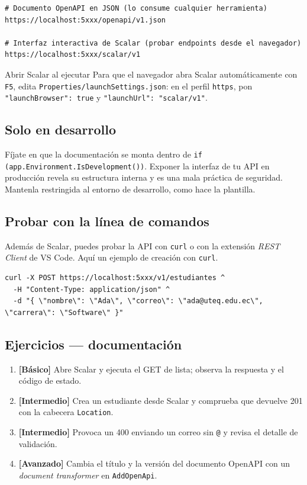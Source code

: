\documentclass[11pt]{article}
\begin{document}
\begin{cajacodigo}
\begin{lstlisting}[style=shell]
# Documento OpenAPI en JSON (lo consume cualquier herramienta)
https://localhost:5xxx/openapi/v1.json

# Interfaz interactiva de Scalar (probar endpoints desde el navegador)
https://localhost:5xxx/scalar/v1
\end{lstlisting}
\end{cajacodigo}
\vspace{2pt}
\begin{cajavscode}{Abrir Scalar al ejecutar}
Para que el navegador abra Scalar automáticamente con \texttt{F5}, edita \texttt{Properties/launchSettings.json}: en el perfil \texttt{https}, pon \texttt{"launchBrowser": true} y \texttt{"launchUrl": "scalar/v1"}.
\end{cajavscode}

\subsection{Solo en desarrollo}
Fíjate en que la documentación se monta dentro de \texttt{if (app.Environment.IsDevelopment())}. Exponer la interfaz de tu API en producción revela su estructura interna y es una mala práctica de seguridad. Mantenla restringida al entorno de desarrollo, como hace la plantilla.

\subsection{Probar con la línea de comandos}
Además de Scalar, puedes probar la API con \texttt{curl} o con la extensión \emph{REST Client} de VS Code. Aquí un ejemplo de creación con \texttt{curl}.

\begin{cajacodigo}
\begin{lstlisting}[style=shell]
curl -X POST https://localhost:5xxx/v1/estudiantes ^
  -H "Content-Type: application/json" ^
  -d "{ \"nombre\": \"Ada\", \"correo\": \"ada@uteq.edu.ec\", \"carrera\": \"Software\" }"
\end{lstlisting}
\end{cajacodigo}

\subsection{Ejercicios — documentación}
\begin{enumerate}[leftmargin=1.7em,itemsep=3pt,topsep=2pt]
\item \textbf{[Básico]} Abre Scalar y ejecuta el GET de lista; observa la respuesta y el código de estado.
\item \textbf{[Intermedio]} Crea un estudiante desde Scalar y comprueba que devuelve 201 con la cabecera \texttt{Location}.
\item \textbf{[Intermedio]} Provoca un 400 enviando un correo sin \texttt{@} y revisa el detalle de validación.
\item \textbf{[Avanzado]} Cambia el título y la versión del documento OpenAPI con un \emph{document transformer} en \texttt{AddOpenApi}.
\end{enumerate}
\end{document}
